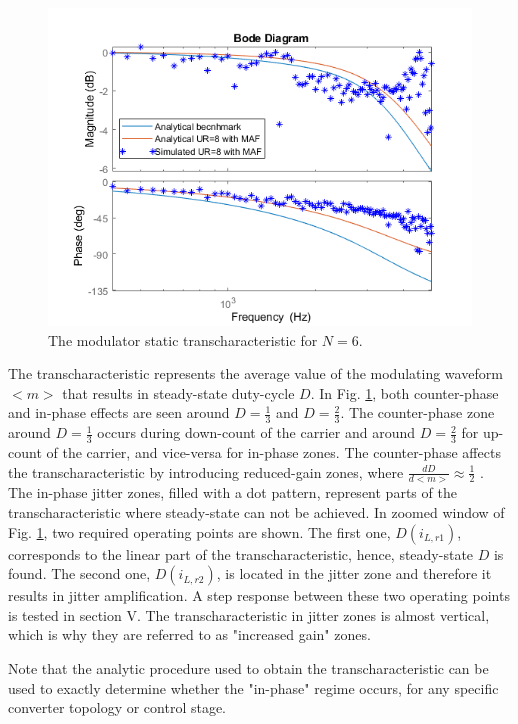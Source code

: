 \documentclass[journal]{IEEEtran}
\begin{document}
\begin{figure}[t!]
    \centerline{\includegraphics[width=0.95\linewidth]{figures/nasDif_clfra.png}}
    \caption{The modulator static transcharacteristic for $N=6$.}
    \label{fig:TransCH}    
\end{figure}

The transcharacteristic represents the average value of the modulating waveform $<m>$ that results in steady-state duty-cycle $D$. 
In Fig. \ref{fig:TransCH}, both counter-phase and in-phase effects are seen around $D = \frac{1}{3}$ and $D = \frac{2}{3}$. The counter-phase zone around $D = \frac{1}{3}$ occurs during down-count of the carrier and around $D = \frac{2}{3}$ for up-count of the carrier, and vice-versa for in-phase zones. The counter-phase affects the transcharacteristic by introducing reduced-gain zones, where $\frac{dD}{d<m>}\approx \frac{1}{2}$  . The in-phase jitter zones, filled with a dot pattern, represent parts of the transcharacteristic where steady-state can not be achieved. In zoomed window of Fig. \ref{fig:TransCH}, two required operating points are shown. The first one, $D(i_{L,r1})$, corresponds to the linear part of the transcharacteristic, hence, steady-state $D$ is found. The second one, $D(i_{L,r2})$, is located in the jitter zone and therefore it results in jitter amplification. A step response between these two operating points is tested in section V. The transcharacteristic in jitter zones is almost vertical, which is why they are referred to as "increased gain" zones. 

Note that the analytic procedure used to obtain the transcharacteristic can be used to exactly determine whether the "in-phase" regime occurs, for any specific converter topology or control stage.
\end{document}
